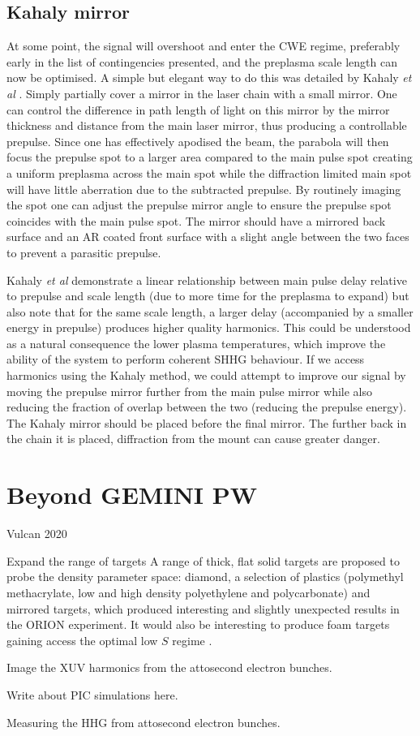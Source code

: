 \subsection{Kahaly mirror}
At some point, the signal will overshoot and enter the CWE regime, preferably early in the list of contingencies presented, and the preplasma scale length can now be optimised. A simple but elegant way to do this was detailed by Kahaly \textit{et al} \cite{kahalyDirectObservationDensityGradient2013}. Simply partially cover a mirror in the laser chain with a small mirror. One can control the difference in path length of light on this mirror by the mirror thickness and distance from the main laser mirror, thus producing a controllable prepulse. Since one has effectively apodised the beam, the parabola will then focus the prepulse spot to a larger area compared to the main pulse spot creating a uniform preplasma across the main spot while the diffraction limited main spot will have little aberration due to the subtracted prepulse. By routinely imaging the spot one can adjust the prepulse mirror angle to ensure the prepulse spot coincides with the main pulse spot. The mirror should have a mirrored back surface and an AR coated front surface with a slight angle between the two faces to prevent a parasitic prepulse.

Kahaly \textit{et al} demonstrate a linear relationship between main pulse delay relative to prepulse and scale length (due to more time for the preplasma to expand) but also note that for the same scale length, a larger delay (accompanied by a smaller energy in prepulse) produces higher quality harmonics. This could be understood as a natural consequence the lower plasma temperatures, which improve the ability of the system to perform coherent SHHG behaviour. If we access harmonics using the Kahaly method, we could attempt to improve our signal by moving the prepulse mirror further from the main pulse mirror while also reducing the fraction of overlap between the two (reducing the prepulse energy). The Kahaly mirror should be placed before the final mirror. The further back in the chain it is placed, diffraction from the mount can cause greater danger.



\section{Beyond GEMINI PW}
Vulcan 2020

Expand the range of targets A range of thick, flat solid targets are proposed to probe the density parameter space: diamond, a selection of plastics (polymethyl methacrylate, low and high density polyethylene and polycarbonate) and mirrored targets, which produced interesting and slightly unexpected results in the ORION experiment. It would also be interesting to produce foam targets gaining access the optimal low $S$ regime \cite{bataniPhysicsIssuesShock2014}.

Image the XUV harmonics from the attosecond electron bunches.

Write about PIC simulations here.

Measuring the HHG from attosecond electron bunches.







